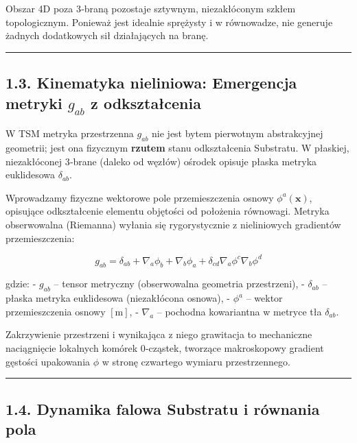 \documentclass[
  letterpaper,
  DIV=11,
  numbers=noendperiod]{scrartcl}
\numberwithin{equation}{subsection}
\begin{document}
Obszar 4D poza 3‑braną pozostaje sztywnym, niezakłóconym szkłem
topologicznym. Ponieważ jest idealnie sprężysty i w równowadze, nie
generuje żadnych dodatkowych sił działających na branę.

\begin{center}\rule{0.5\linewidth}{0.5pt}\end{center}

\subsection{\texorpdfstring{1.3. Kinematyka nieliniowa: Emergencja
metryki \(g_{ab}\) z
odkształcenia}{1.3. Kinematyka nieliniowa: Emergencja metryki g\_\{ab\} z odkształcenia}}\label{kinematyka-nieliniowa-emergencja-metryki-g_ab-z-odksztaux142cenia}

W TSM metryka przestrzenna \(g_{ab}\) nie jest bytem pierwotnym
abstrakcyjnej geometrii; jest ona fizycznym \textbf{rzutem} stanu
odkształcenia Substratu. W płaskiej, niezakłóconej 3‑brane (daleko od
węzłów) ośrodek opisuje płaska metryka euklidesowa \(\delta_{ab}\).

Wprowadzamy fizyczne wektorowe pole przemieszczenia osnowy
\(\phi^a(\mathbf{x})\), opisujące odkształcenie elementu objętości od
położenia równowagi. Metryka obserwowalna (Riemanna) wyłania się
rygorystycznie z nieliniowych gradientów przemieszczenia:

\[g_{ab} = \delta_{ab} + \nabla_a \phi_b + \nabla_b \phi_a + \delta_{cd} \nabla_a \phi^c \nabla_b \phi^d \tag{1.3.1}\]

gdzie: - \(g_{ab}\) -- tensor metryczny (obserwowalna geometria
przestrzeni), - \(\delta_{ab}\) -- płaska metryka euklidesowa
(niezakłócona osnowa), - \(\phi^a\) -- wektor przemieszczenia osnowy
\([\text{m}]\), - \(\nabla_a\) -- pochodna kowariantna w metryce tła
\(\delta_{ab}\).

Zakrzywienie przestrzeni i wynikająca z niego grawitacja to mechaniczne
naciągnięcie lokalnych komórek 0‑cząstek, tworzące makroskopowy gradient
gęstości upakowania \(\phi\) w stronę czwartego wymiaru przestrzennego.

\begin{center}\rule{0.5\linewidth}{0.5pt}\end{center}

\subsection{1.4. Dynamika falowa Substratu i równania
pola}\label{dynamika-falowa-substratu-i-ruxf3wnania-pola}
\end{document}

